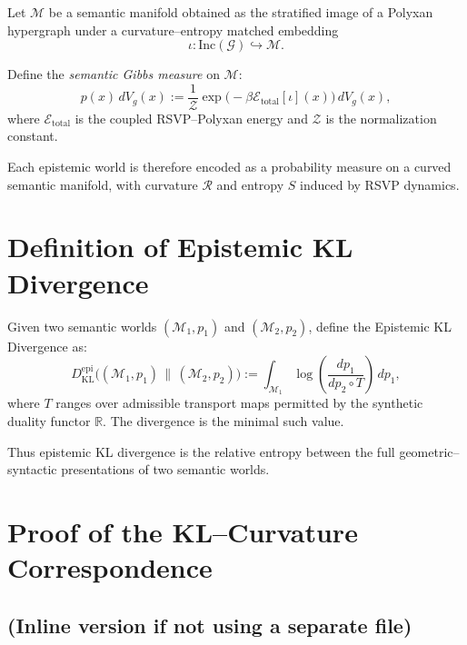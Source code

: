 Let $\mathcal{M}$ be a semantic manifold obtained as the stratified image of a Polyxan hypergraph under a curvature--entropy matched embedding
\[
\iota : \mathrm{Inc}(\mathcal{G}) \hookrightarrow \mathcal{M}.
\]

Define the \emph{semantic Gibbs measure} on $\mathcal{M}$:
\begin{equation}
p(x)\,dV_g(x)
  := \frac{1}{\mathcal{Z}}
      \exp\bigl(-\beta \mathcal{E}_{\mathrm{total}}[\iota](x)\bigr)\,dV_g(x),
\end{equation}
where $\mathcal{E}_{\mathrm{total}}$ is the coupled RSVP--Polyxan energy
and $\mathcal{Z}$ is the normalization constant.

Each epistemic world is therefore encoded as a probability measure on a curved semantic manifold,
with curvature $\mathcal{R}$ and entropy $S$ induced by RSVP dynamics.


\section{Definition of Epistemic KL Divergence}

Given two semantic worlds $(\mathcal{M}_1,p_1)$ and $(\mathcal{M}_2,p_2)$,
define the Epistemic KL Divergence as:
\begin{equation}
\label{eq:epistemic-kl-def}
D_{\mathrm{KL}}^{\mathrm{epi}}
   \bigl((\mathcal{M}_1,p_1)\,\|\,(\mathcal{M}_2,p_2)\bigr)
  :=
  \int_{\mathcal{M}_1}
    \log\!\left(\frac{dp_1}{dp_2\circ T}\right)
  \, dp_1,
\end{equation}
where $T$ ranges over admissible transport maps permitted by the synthetic duality functor $\mathbb{R}$.
The divergence is the minimal such value.

Thus epistemic KL divergence is the relative entropy between the full geometric--syntactic presentations of two semantic worlds.


\section{Proof of the KL--Curvature Correspondence}



\subsection*{(Inline version if not using a separate file)}

